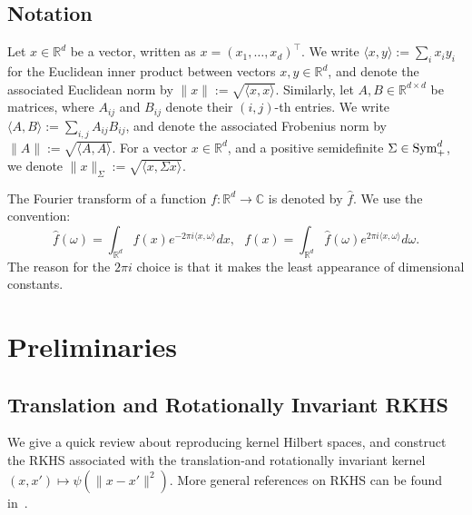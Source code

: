\documentclass[sn-mathphys-num]{sn-jnl}%
\numberwithin{equation}{section}
\newcommand{\R}{\mathbb{R}}
\newcommand{\E}{\mathbb{E}}
\newcommand{\Cov}{{\rm Cov}}
\newcommand{\C}{\mathbb{C}}
\newcommand{\Sym}{{\rm \mathrm{Sym}}}
\theoremstyle{thmstyleone}%
\theoremstyle{thmstyletwo}%
\theoremstyle{thmstylethree}%
\begin{document}
\subsection{Notation} %
Let $x \in \mathbb{R}^d$ be a vector, written as $x = (x_1,\dots,x_d)^\top$. We write $\langle x, y \rangle := \sum_{i} x_i y_i$ for the Euclidean inner product between vectors $x,y \in \mathbb{R}^d$, and denote the associated Euclidean norm by $\|x\| := \sqrt{\langle x,x \rangle}$. Similarly, let $A,B \in \mathbb{R}^{d \times d}$ be matrices, where $A_{ij}$ and $B_{ij}$ denote their $(i,j)$-th entries. We write $\langle A, B \rangle := \sum_{i,j} A_{ij} B_{ij}$, and denote the associated Frobenius norm by $\|A\| := \sqrt{\langle A,A \rangle}$. 
For a vector $x \in \mathbb{R}^d$, and a positive semidefinite $\Sigma \in \Sym_+^d$, we denote 
$\|x\|_{\Sigma} := \sqrt{\langle x, \Sigma x \rangle}$. 
%

The Fourier transform of a function \( f : \R^d \to \C \) is denoted by \( \hat{f} \). We use the convention:
\begin{equation*}
	\hat{f}(\omega) = \int_{\R^d} f(x) e^{-2\pi i\langle x, \omega\rangle} dx,~~~f(x) = \int_{\R^d} \hat{f}(\omega) e^{2\pi i \langle x, \omega \rangle} d\omega. 
\end{equation*} 
 The reason for the $2\pi i$ choice is that it makes the least appearance of dimensional constants.







\section{Preliminaries} 
\label{sec:preliminaries} 
\subsection{Translation and Rotationally Invariant RKHS} 
We give a quick review about reproducing kernel Hilbert spaces, and construct the RKHS 
associated with the translation-and rotationally invariant kernel $(x,x') \mapsto \psi(\|x-x'\|^2)$.
More general references on RKHS can be found in~\cite{Aronszajn50, CuckerSm02}. 
  
\end{document}
